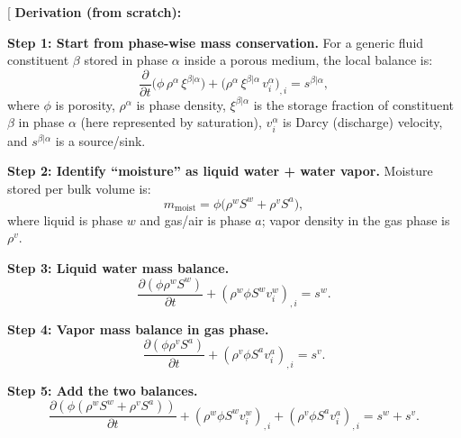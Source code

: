 \documentclass[12pt]{article}
\newcommand{\deftheory}[9][Not Applicable]
{
\newpage
\noindent \rule{\textwidth}{0.5mm}

\paragraph{RefName: } \textbf{#2} \phantomsection
\label{#2}

\paragraph{Label:} #3

\noindent \rule{\textwidth}{0.5mm}

\paragraph{Equation:}
#4

\paragraph{Description:}
#5

\paragraph{Notes:}
#6

\paragraph{Source:}
#7

\paragraph{Ref.\ By:}
#8

\paragraph{Preconditions for \hyperref[#2]{#2}:}
\label{#2_precond}
#9

\paragraph{Derivation for \hyperref[#2]{#2}:}
\label{#2_deriv}
#1

\noindent \rule{\textwidth}{0.5mm}
}
\begin{document}
\noindent
{}[
\textbf{Derivation (from scratch):}

\textbf{Step 1: Start from phase-wise mass conservation.}
For a generic fluid constituent $\beta$ stored in phase $\alpha$ inside a porous medium,
the local balance is:
\[
\frac{\partial}{\partial t}\big(\phi\,\rho^\alpha\,\xi^{\beta|\alpha}\big)
+\big(\rho^\alpha\,\xi^{\beta|\alpha}\,v_i^\alpha\big)_{,i}
= s^{\beta|\alpha},
\]
where $\phi$ is porosity, $\rho^\alpha$ is phase density, $\xi^{\beta|\alpha}$ is the storage fraction of constituent $\beta$ in phase $\alpha$ (here represented by saturation), $v_i^\alpha$ is Darcy (discharge) velocity, and $s^{\beta|\alpha}$ is a source/sink.

\textbf{Step 2: Identify “moisture” as liquid water + water vapor.}
Moisture stored per bulk volume is:
\[
m_{\text{moist}} = \phi\big(\rho^w S^w + \rho^v S^a\big),
\]
where liquid is phase $w$ and gas/air is phase $a$; vapor density in the gas phase is $\rho^v$.

\textbf{Step 3: Liquid water mass balance.}
\[
\frac{\partial(\phi\rho^w S^w)}{\partial t} + (\rho^w \phi S^w v_i^w)_{,i} = s^w.
\]

\textbf{Step 4: Vapor mass balance in gas phase.}
\[
\frac{\partial(\phi\rho^v S^a)}{\partial t} + (\rho^v \phi S^a v_i^a)_{,i} = s^v.
\]

\textbf{Step 5: Add the two balances.}
\[
\frac{\partial\left(\phi(\rho^wS^w+\rho^vS^a)\right)}{\partial t}
+(\rho^w\phi S^w v_i^w)_{,i}
+(\rho^v\phi S^a v_i^a)_{,i}
= s^w+s^v.
\]
\end{document}
